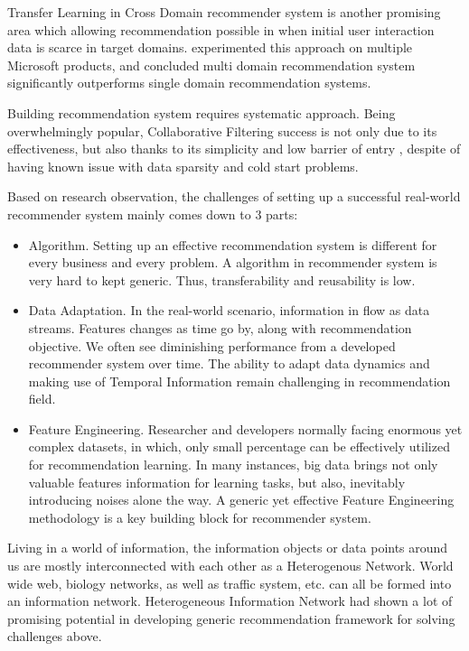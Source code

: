 Transfer Learning \citep{Pan2010} in Cross Domain recommender system is another promising area which allowing recommendation possible in when initial user interaction data is scarce in target domains. \citet{Elkahky2015} experimented this approach on multiple Microsoft products, and concluded multi domain recommendation system significantly outperforms single domain recommendation systems. 


Building recommendation system requires systematic approach. Being overwhelmingly popular, Collaborative Filtering success is not only due to its effectiveness, but also thanks to its simplicity and low barrier of entry \citep{Amatriain2016}, despite of having known issue with data sparsity and cold start problems.

Based on research observation, the challenges of setting up a successful real-world recommender system mainly comes down to 3 parts:  

\begin{itemize}
\item Algorithm. Setting up an effective recommendation system is different for every business and every problem. A algorithm in recommender system is very hard to kept generic. Thus, transferability and reusability is low.

\item Data Adaptation. In the real-world scenario, information in flow as data streams. Features changes as time go by, along with recommendation objective. We often see diminishing performance from a developed recommender system over time. The ability to adapt data dynamics and making use of Temporal Information remain challenging in recommendation field.

\item Feature Engineering. Researcher and developers normally facing enormous yet complex datasets, in which, only small percentage can be effectively utilized for recommendation learning. In many instances, big data brings not only valuable features information for learning tasks, but also, inevitably introducing noises alone the way. A generic yet effective Feature Engineering methodology is a key building block for recommender system.
\end{itemize}

Living in a world of information, the information objects or data points around us are mostly interconnected with each other as a Heterogenous Network. World wide web, biology networks, as well as traffic system, etc. can all be formed into an information network. Heterogeneous Information Network had shown a lot of promising potential in developing generic recommendation framework for solving challenges above.



